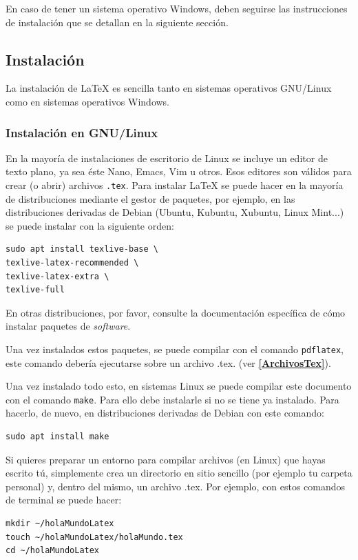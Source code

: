 \documentclass[]{article}
\begin{document}
En caso de tener un sistema operativo Windows, deben seguirse las instrucciones
de instalación que se detallan en la siguiente sección.
\subsection{Instalación}
La instalación de \LaTeX{} es sencilla tanto en sistemas operativos GNU/Linux
como en sistemas operativos Windows.
\subsubsection{Instalación en GNU/Linux}\label{instGNULinux}
En la mayoría de instalaciones de escritorio de Linux se incluye un editor de
texto plano, ya sea éste Nano, Emacs, Vim u otros. Esos editores son válidos para
crear (o abrir) archivos \texttt{.tex}. Para instalar \LaTeX{} se puede hacer
en la mayoría de distribuciones mediante el gestor de paquetes, por ejemplo, en
las distribuciones derivadas de Debian (Ubuntu, Kubuntu, Xubuntu, Linux Mint...)
se puede instalar con la siguiente orden:
\begin{verbatim}
sudo apt install texlive-base \
texlive-latex-recommended \
texlive-latex-extra \
texlive-full
\end{verbatim} 
En otras distribuciones, 
por favor, consulte la documentación específica de cómo instalar paquetes de
\textit{software}.

Una vez instalados estos paquetes, se puede compilar con el comando
\texttt{pdflatex}, este comando debería ejecutarse sobre un archivo .tex.
(ver \textbf{\ref{ArchivosTex}}).

Una vez instalado todo esto, en sistemas Linux se puede compilar este 
documento con el comando \texttt{make}. Para ello debe instalarle si no se
tiene ya instalado. Para hacerlo, de nuevo, en distribuciones derivadas de
Debian con este comando:
\begin{verbatim}
sudo apt install make
\end{verbatim}

Si quieres preparar un entorno para compilar archivos (en Linux) que hayas
escrito tú, simplemente crea un directorio en sitio sencillo (por ejemplo tu
carpeta personal) y, dentro del mismo, un archivo .tex. Por ejemplo, con estos
comandos de terminal se puede hacer:
\begin{verbatim}
mkdir ~/holaMundoLatex
touch ~/holaMundoLatex/holaMundo.tex
cd ~/holaMundoLatex
\end{verbatim}
\end{document}
